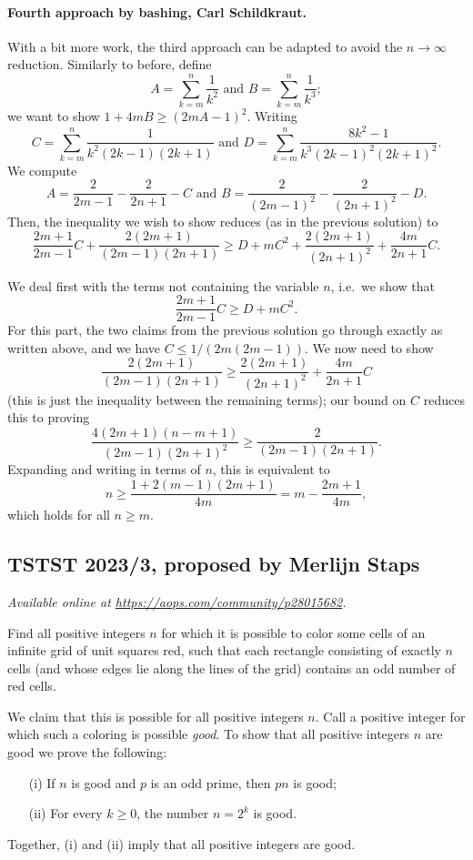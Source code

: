 \documentclass[11pt]{scrartcl}
\begin{document}
\paragraph{Fourth approach by bashing, Carl Schildkraut.}
With a bit more work, the third approach can be adapted to avoid the $n\to\infty$ reduction.
Similarly to before, define
\[ A=\sum_{k=m}^n\frac1{k^2}\text{ and }B=\sum_{k=m}^n \frac1{k^3}; \]
we want to show $1+4mB\geq (2mA-1)^2$. Writing
\[ C=\sum_{k=m}^n\frac1{k^2(2k-1)(2k+1)}
  \text{ and }D=\sum_{k=m}^n \frac{8k^2-1}{k^3(2k-1)^2(2k+1)^2}. \]
We compute
\[ A=\frac2{2m-1}-\frac2{2n+1}-C \text{ and } B=\frac2{(2m-1)^2}-\frac2{(2n+1)^2}-D. \]
Then, the inequality we wish to show reduces (as in the previous solution) to
\[
  \frac{2m+1}{2m-1}C+\frac{2(2m+1)}{(2m-1)(2n+1)}
  \geq D+mC^2+\frac{2(2m+1)}{(2n+1)^2}+\frac{4m}{2n+1}C.
\]

We deal first with the terms not containing the variable $n$, i.e.\ we show that
\[ \frac{2m+1}{2m-1}C\geq D+mC^2. \]
For this part, the two claims from the previous solution go through exactly
as written above, and we have $C\leq 1/(2m(2m-1))$.
We now need to show
\[ \frac{2(2m+1)}{(2m-1)(2n+1)} \geq \frac{2(2m+1)}{(2n+1)^2}+\frac{4m}{2n+1}C \]
(this is just the inequality between the remaining terms);
our bound on $C$ reduces this to proving
\[\frac{4(2m+1)(n-m+1)}{(2m-1)(2n+1)^2}\geq \frac2{(2m-1)(2n+1)}.\]
Expanding and writing in terms of $n$, this is equivalent to
\[n\geq \frac{1+2(m-1)(2m+1)}{4m}=m-\frac{2m+1}{4m},\]
which holds for all $n\geq m$.
\pagebreak

\subsection{TSTST 2023/3, proposed by Merlijn Staps}
\textsl{Available online at \url{https://aops.com/community/p28015682}.}
\begin{mdframed}[style=mdpurplebox,frametitle={Problem statement}]
Find all positive integers $n$ for which it is possible to color some cells of
an infinite grid of unit squares red, such that each rectangle consisting of
exactly $n$ cells (and whose edges lie along the lines of the grid) contains
an odd number of red cells.
\end{mdframed}
We claim that this is possible for all positive integers $n$. Call a positive integer for which such a coloring is possible \emph{good}. To show that all positive integers $n$ are good we prove the following:
\begin{itemize}
\item[(i)] If $n$ is good and $p$ is an odd prime, then $pn$ is good;
\item[(ii)] For every $k \ge 0$, the number $n=2^k$ is good.
\end{itemize}
Together, (i) and (ii) imply that all positive integers are good.
\end{document}

